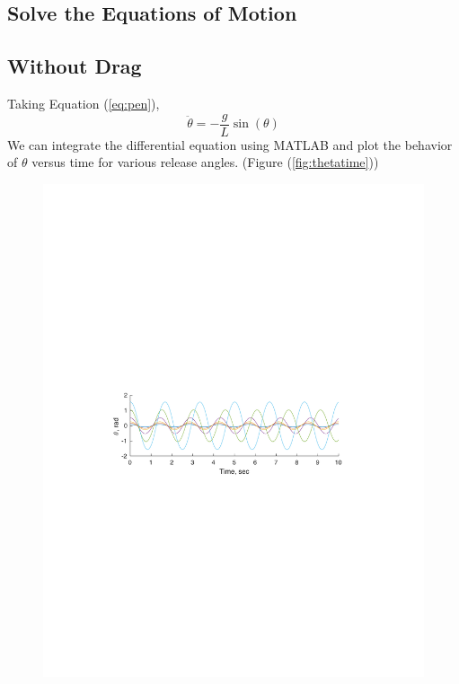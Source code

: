 \documentclass[12pt]{report}
\begin{document}
\begin{flushleft}
\section{Solve the Equations of Motion}
\subsection{Without Drag}
\flushleft
Taking Equation (\ref{eq:pen}),
$$\ddot{\theta} = -\frac{g}{L}\sin(\theta)$$
We can integrate the differential equation using MATLAB and plot the behavior of
$\theta$ versus time for various release angles. (Figure (\ref{fig:thetatime})) \\
\begin{figure}[h]
\begin{minipage}[c]{.85\textwidth}
  \includegraphics[center,width=.9\textwidth]{theta}
\end{minipage}%
\begin{minipage}[c]{.15\textwidth}

\end{minipage}
\end{figure}
\end{flushleft}
\end{document}
